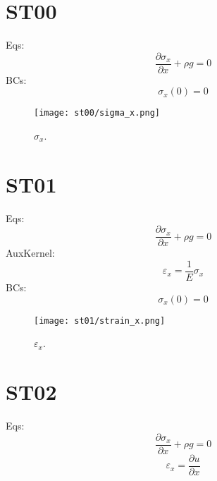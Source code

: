 \documentclass[11pt,letterpaper]{article}
\begin{document}
	
\section{ST00}

Eqs:
\begin{equation}
\frac{\partial \sigma_x}{\partial x} + \rho g = 0
\end{equation}
BCs:
\begin{equation}
\sigma_x (0) = 0
\end{equation}

\begin{figure}[H]
	\centering
	\texttt{[image: st00/sigma\_x.png]}
	\hfill
	\caption{$\sigma_x$.}
	\label{fig:st00}
\end{figure}

\section{ST01}

Eqs:
\begin{equation}
\frac{\partial \sigma_x}{\partial x} + \rho g = 0
\end{equation}
AuxKernel:
\begin{equation}
\varepsilon_x = \frac{1}{E}\sigma_x
\end{equation}
BCs:
\begin{equation}
\sigma_x (0) = 0
\end{equation}

\begin{figure}[H]
	\centering
	\texttt{[image: st01/strain\_x.png]}
	\hfill
	\caption{$\varepsilon_x$.}
	\label{fig:st01}
\end{figure}

\section{ST02}

Eqs:
\begin{equation}
\frac{\partial \sigma_x}{\partial x} + \rho g = 0
\end{equation}
\begin{equation}
\varepsilon_x = \frac{\partial u}{\partial x}
\end{equation}
\end{document}
